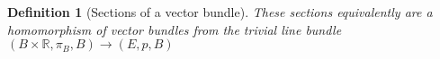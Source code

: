 \documentclass[12pt]{article}
\numberwithin{equation}{section}
\newcommand{\R}{\mathbb{R}}
\newcounter{dummy} \numberwithin{dummy}{section}
\newtheorem{definition}[dummy]{Definition}
\begin{document}
\begin{appendices}
\begin{definition}[Sections of a vector bundle]
		These sections equivalently are a homomorphism of vector bundles from the trivial line bundle $(B \times \R, \pi_B, B) \to (E,p,B)$
	\end{definition}
%	
%	
%	
	
	

\end{appendices}
\end{document}
